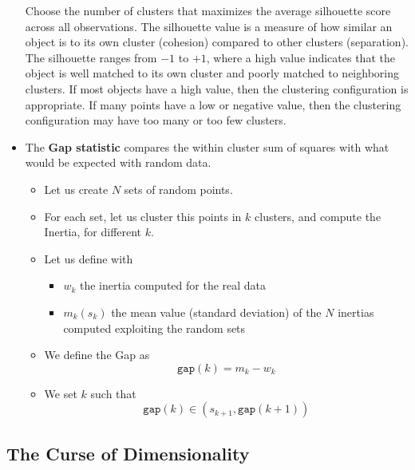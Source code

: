 \begin{itemize}
          Choose the number of clusters that maximizes the average silhouette score across all observations.
          The silhouette value is a measure of how similar an object is to its own cluster (cohesion) compared to other clusters (separation). The silhouette ranges from $-1$ to $+1$, where a high value indicates that the object is well matched to its own cluster and poorly matched to neighboring clusters. If most objects have a high value, then the clustering configuration is appropriate. If many points have a low or negative value, then the clustering configuration may have too many or too few clusters.
    \item The \textbf{Gap statistic} compares the within cluster sum of squares with what would be expected with random data.
          \begin{itemize}
              \item Let us create $N$ sets of random points.
              \item For each set, let us cluster this points in $k$ clusters, and compute the Inertia, for different $k$.
              \item Let us define with
                    \begin{itemize}
                        \item $w_{k}$ the inertia computed for the real data
                        \item $m_{k}(s_{k})$ the mean value (standard deviation) of the $N$ inertias computed exploiting the random sets
                    \end{itemize}
              \item We define the Gap as
                    \begin{equation*}
                        \texttt{gap}(k) = m_{k} - w_{k}
                    \end{equation*}
              \item We set $k$ such that
                    \begin{equation*}
                        \texttt{gap}(k) \in (s_{k+1},\texttt{gap}(k+1))
                    \end{equation*}
          \end{itemize}
\end{itemize}

\subsection{The Curse of Dimensionality}

